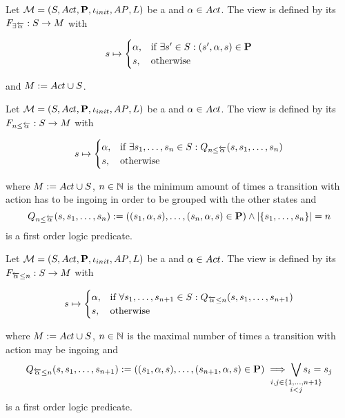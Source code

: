 \documentclass[preview]{standalone}
\begin{document}
\begin{definition}
	Let ${{{\mathcal{M}}}} = {{({S}, {Act}, {\textbf{P}}, {\iota_{init}}, {AP}, {L})}}$ be a \chosengraphtypeN and ${\alpha} \in {Act}$. The view \viewhasinaction is defined by its \grpfctN ${{{{F}}_{\exists{\overleftarrow{\ensuremath{{\alpha}}}}}}} : {S} \to {\ensuremath{{M}}}$ with 
	
	\[
	{s} \mapsto
	\begin{cases}
		{\alpha},				& \text{if } \exists {s}' \in {S}: ({s}', {\alpha}, {s}) \in {\ensuremath{{\textbf{P}}}} \\
		{s},          	& \text{otherwise}
	\end{cases}
	\]
	
	and ${{M}} := {Act} \cup {S}$.	
	\label{def:mininaction}
\end{definition}	


\begin{definition}
	Let ${{{\mathcal{M}}}} = {{({S}, {Act}, {\textbf{P}}, {\iota_{init}}, {AP}, {L})}}$ be a \chosengraphtypeN and ${\alpha} \in {Act}$. The view \viewmininaction is defined by its \grpfctN ${{{{F}}_{{n}\leq{\overleftarrow{\ensuremath{{\alpha}}}}}}} : {S} \to {M}$ with
	
	\[
	{s} \mapsto
	\begin{cases}
		{\alpha},				& \text{if } \exists {s}_1, \dots, {s}_{n} \in {S}:  {Q_{{n}\leq{\overleftarrow{\ensuremath{{\alpha}}}}}({s},{s}_1, \dots, {s}_{{n}})}\\
		{s},          	& \text{otherwise}
	\end{cases}
	\]
	
	where ${{M}} := {Act} \cup {S}$, ${n} \in {\mathbb{N}}$ is the minimum amount of times a transition with action \action has to be ingoing in order to be grouped with the other states and
	\[
	{Q_{{n}\leq{\overleftarrow{\ensuremath{{\alpha}}}}}({s},{s}_1, \dots, {s}_{{n}})} := (({s}_1, {\alpha}, {s}), \dots, ({s}_{n}, {\alpha}, {s}) \in {\ensuremath{{\textbf{P}}}}) \land |\{{s}_1, \dots, {s}_{n}\}| = {n}
	\]
	is a first order logic predicate.
	\label{def:viewmaxinaction}
\end{definition}

\begin{definition}
	Let ${{{\mathcal{M}}}} = {{({S}, {Act}, {\textbf{P}}, {\iota_{init}}, {AP}, {L})}}$ be a \chosengraphtypeN and ${\alpha} \in {Act}$. The view \viewmaxinaction is defined by its \grpfctN ${{{{F}}_{{\overleftarrow{{\alpha}}}\leq{n}}}} : {S} \to {M}$ with
	
	\[
	{s} \mapsto
	\begin{cases}
		{\alpha},				& \text{if } \forall {s}_1, \dots, {s}_{{n}+1} \in {S}: {Q_{{\overleftarrow{{\alpha}}}\leq{n}}({s},{s}_1, \dots, {s}_{{n}+1})} \\
		{s},          	& \text{otherwise}
	\end{cases}
	\]
	
	where ${{M}} := {Act} \cup {S}$, ${n} \in {\mathbb{N}}$ is the maximal number of times a transition with action \action may be ingoing and 
	\[
	\predmaxinact := ((\state_1, \action, \state), \dots, (\state_{\numinact+1}, \action, \state) \in \trans) \implies \bigvee_{\mathclap{\substack{i,j \in \{1,\dots, \numinact+1\} \\ i < j}}} \state_i = \state_j
	\]
	is a first order logic predicate.
\end{definition}
\end{document}
